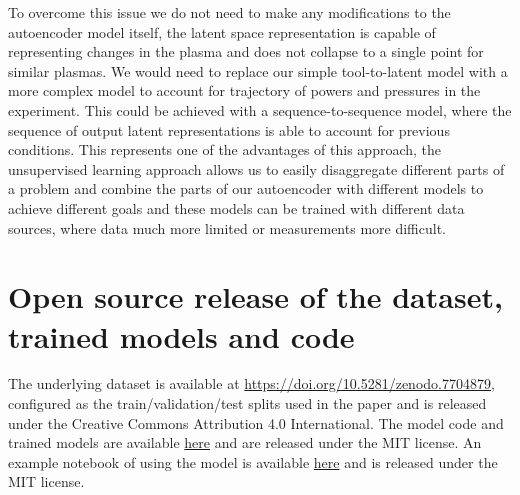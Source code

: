 \documentclass[10pt]{iopart}
\begin{document}
To overcome this issue we do not need to make any modifications to the autoencoder model itself, the latent space representation is capable of representing changes in the plasma and does not collapse to a single point for similar plasmas. We would need to replace our simple tool-to-latent model with a more complex model to account for trajectory of powers and pressures in the experiment. This could be achieved with a sequence-to-sequence model, where the sequence of output latent representations is able to account for previous conditions. This represents one of the advantages of this approach, the unsupervised learning approach allows us to easily disaggregate different parts of a problem and combine the parts of our autoencoder with different models to achieve different goals and these models can be trained with different data sources, where data much more limited or measurements more difficult.


\section{Open source release of the dataset, trained models and code}\label{foss}


The underlying dataset is available at \url{https://doi.org/10.5281/zenodo.7704879}, configured as the train/validation/test splits used in the paper and is released under the Creative Commons Attribution 4.0 International. The model code and trained models are available \href{https://github.com/gregdaly/generative_modelling_for_optical_plasma_diagnostics}{here} and are released under the MIT license. An example notebook of using the model is available \href{https://colab.research.google.com/github/gregdaly/generative_modelling_for_optical_plasma_diagnostics/blob/master/generative_decoder_demo.ipynb}{here} and is released under the MIT license.
\end{document}
